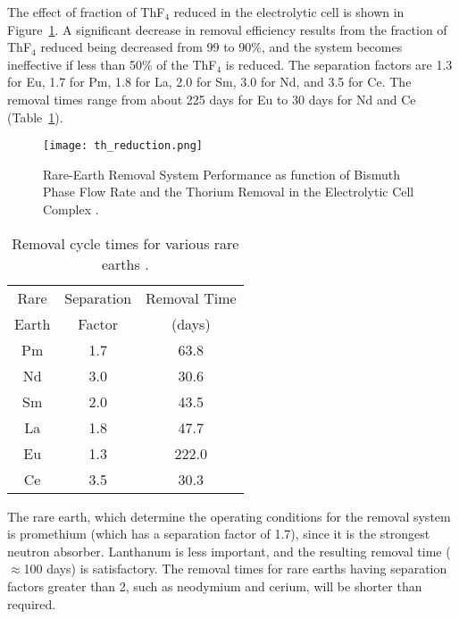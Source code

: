 The effect of fraction of ThF$_4$ reduced in the electrolytic cell is shown in Figure~\ref{fig:th-reduction}. A significant decrease in removal efficiency results from the fraction of ThF$_4$ reduced being decreased from 99 to 90\%, and the system becomes ineffective if less than 50\% of the ThF$_4$ is reduced.  The separation factors are 1.3 for Eu, 1.7 for Pm, 1.8 for La, 2.0 for Sm, 3.0 for Nd, and 3.5 for Ce. The removal times range from about 225 days for Eu to 30 days for Nd and Ce (Table~\ref{tab:removal_time}). 
\begin{figure}[htbp!]
  \centering
        \texttt{[image: th\_reduction.png]}
    \caption{Rare-Earth Removal System Performance as function of Bismuth Phase Flow Rate and the Thorium Removal in the Electrolytic Cell Complex \cite{briggs_molten-salt_1969}.}
    \label{fig:th-reduction}
\end{figure}
\begin{table}[ht!]
\caption{Removal cycle times for various rare earths \cite{briggs_molten-salt_1969}.}
  \centering
\begin{tabular}{c c c}
\hline Rare  & Separation & Removal Time                        \\
       Earth & Factor     & (days)								\\
\hline Pm          & 1.7				& 63.8 					\\
\hline Nd		   & 3.0                & 30.6 					\\
\hline Sm		   & 2.0                & 43.5 					\\
\hline La		   & 1.8                & 47.7 					\\
\hline Eu		   & 1.3                & 222.0 				\\
\hline Ce		   & 3.5                & 30.3 					\\
\hline 
\end{tabular}
  		\label{tab:removal_time}
\end{table}

The rare earth, which determine the operating conditions for the removal system is promethium (which has a separation factor of 1.7), since it is the strongest neutron absorber. Lanthanum is less important, and the resulting removal time ($\approx$100 days) is satisfactory.
The removal times for rare earths having separation factors greater than 2, such as neodymium and cerium, will be shorter than required.

